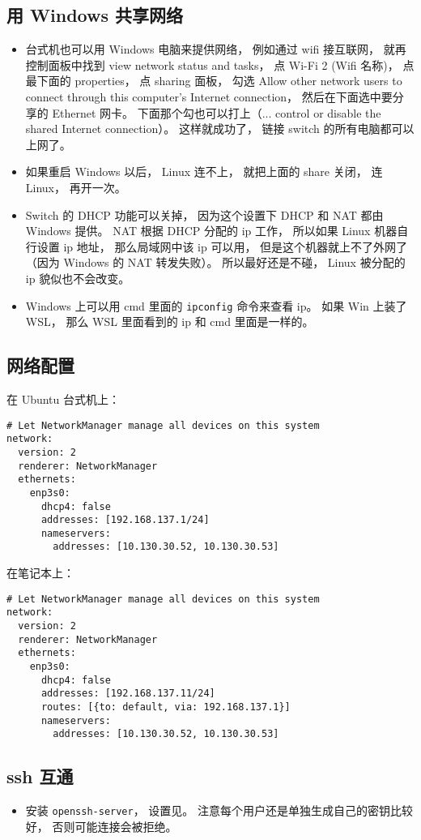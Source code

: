 \subsection{用 Windows 共享网络}
\begin{itemize}
\item 台式机也可以用 Windows 电脑来提供网络， 例如通过 wifi 接互联网， 就再控制面板中找到 view network status and tasks， 点 Wi-Fi 2 (Wifi 名称)， 点最下面的 properties， 点 sharing 面板， 勾选 Allow other network users to connect through this computer's Internet connection， 然后在下面选中要分享的 Ethernet 网卡。 下面那个勾也可以打上（... control or disable the shared Internet connection）。 这样就成功了， 链接 switch 的所有电脑都可以上网了。
\item 如果重启 Windows 以后， Linux 连不上， 就把上面的 share 关闭， 连 Linux， 再开一次。
\item Switch 的 DHCP 功能可以关掉， 因为这个设置下 DHCP 和 NAT 都由 Windows 提供。 NAT 根据 DHCP 分配的 ip 工作， 所以如果 Linux 机器自行设置 ip 地址， 那么局域网中该 ip 可以用， 但是这个机器就上不了外网了（因为 Windows 的 NAT 转发失败）。 所以最好还是不碰， Linux 被分配的 ip 貌似也不会改变。
\item Windows 上可以用 cmd 里面的 \verb|ipconfig| 命令来查看 ip。 如果 Win 上装了 WSL， 那么 WSL 里面看到的 ip 和 cmd 里面是一样的。
\end{itemize}

\subsection{网络配置}
在 Ubuntu 台式机上：
\begin{lstlisting}[caption=/etc/netplan/*.yaml]
# Let NetworkManager manage all devices on this system
network:
  version: 2
  renderer: NetworkManager
  ethernets:
    enp3s0:
      dhcp4: false
      addresses: [192.168.137.1/24]
      nameservers:
        addresses: [10.130.30.52, 10.130.30.53]
\end{lstlisting}
在笔记本上：
\begin{lstlisting}[caption=/etc/netplan/*.yaml]
# Let NetworkManager manage all devices on this system
network:
  version: 2
  renderer: NetworkManager
  ethernets:
    enp3s0:
      dhcp4: false
      addresses: [192.168.137.11/24]
      routes: [{to: default, via: 192.168.137.1}]
      nameservers:
        addresses: [10.130.30.52, 10.130.30.53]
\end{lstlisting}


\subsection{ssh 互通}
\begin{itemize}
\item 安装 \verb|openssh-server|， 设置见。 注意每个用户还是单独生成自己的密钥比较好， 否则可能连接会被拒绝。
\end{itemize}

